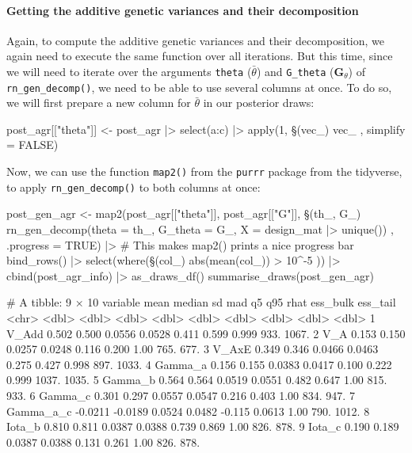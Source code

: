 \documentclass[a4paper,12pt,twoside]{article}
\begin{document}
\paragraph{Getting the additive genetic variances and their decomposition}
Again, to compute the additive genetic variances and their decomposition, we again need to execute the same function over all iterations. But this time, since we will need to iterate over the arguments \texttt{theta} ($\bar{\theta}$) and \texttt{G\_theta} ($\mathbf{G}_{\theta}$) of \texttt{rn\_gen\_decomp()}, we need to be able to use several columns at once.
To do so, we will first prepare a new column for $\bar{\theta}$ in our posterior draws:
\begin{Rinput}
post_agr[["theta"]] <-
    post_agr |>
    select(a:c) |>
    apply(1, \§§(vec_) { vec_ }, simplify = FALSE)
\end{Rinput}
Now, we can use the function \texttt{map2()} from the \texttt{purrr} package from the tidyverse, to apply \texttt{rn\_gen\_decomp()} to both columns at once:
\begin{Rinput}
post_gen_agr <-
    map2(post_agr[["theta"]], post_agr[["G"]],
     \§§(th_, G_) { rn_gen_decomp(theta = th_,
                                G_theta = G_,
                                X = design_mat |> unique()) },
     .progress = TRUE) |>   # This makes map2() prints a nice progress bar
    bind_rows() |>
    select(where(\§§(col_) { abs(mean(col_)) > 10^-5 })) |>
    cbind(post_agr_info) |>
    as_draws_df()
summarise_draws(post_gen_agr)
\end{Rinput}
\begin{Routput}
# A tibble: 9 × 10
  variable     mean  median     sd    mad     q5    q95  rhat ess_bulk ess_tail
  <chr>       <dbl>   <dbl>  <dbl>  <dbl>  <dbl>  <dbl> <dbl>    <dbl>    <dbl>
1 V_Add      0.502   0.500  0.0556 0.0528  0.411 0.599  0.999     933.    1067.
2 V_A        0.153   0.150  0.0257 0.0248  0.116 0.200  1.00      765.     677.
3 V_AxE      0.349   0.346  0.0466 0.0463  0.275 0.427  0.998     897.    1033.
4 Gamma_a    0.156   0.155  0.0383 0.0417  0.100 0.222  0.999    1037.    1035.
5 Gamma_b    0.564   0.564  0.0519 0.0551  0.482 0.647  1.00      815.     933.
6 Gamma_c    0.301   0.297  0.0557 0.0547  0.216 0.403  1.00      834.     947.
7 Gamma_a_c -0.0211 -0.0189 0.0524 0.0482 -0.115 0.0613 1.00      790.    1012.
8 Iota_b     0.810   0.811  0.0387 0.0388  0.739 0.869  1.00      826.     878.
9 Iota_c     0.190   0.189  0.0387 0.0388  0.131 0.261  1.00      826.     878.
\end{Routput}
\end{document}
